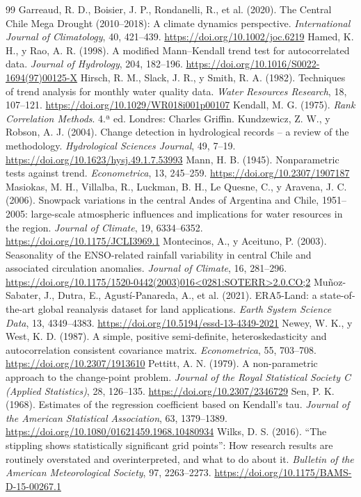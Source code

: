 \documentclass[11pt,letterpaper]{article}
\begin{document}
\begin{thebibliography}{99}
 Garreaud, R. D., Boisier, J. P., Rondanelli, R., et al. (2020). The Central Chile Mega Drought (2010--2018): A climate dynamics perspective. \emph{International Journal of Climatology}, 40, 421--439. \url{https://doi.org/10.1002/joc.6219}
 Hamed, K. H., y Rao, A. R. (1998). A modified Mann--Kendall trend test for autocorrelated data. \emph{Journal of Hydrology}, 204, 182--196. \url{https://doi.org/10.1016/S0022-1694(97)00125-X}
 Hirsch, R. M., Slack, J. R., y Smith, R. A. (1982). Techniques of trend analysis for monthly water quality data. \emph{Water Resources Research}, 18, 107--121. \url{https://doi.org/10.1029/WR018i001p00107}
 Kendall, M. G. (1975). \emph{Rank Correlation Methods}. 4.ª ed. Londres: Charles Griffin.
 Kundzewicz, Z. W., y Robson, A. J. (2004). Change detection in hydrological records -- a review of the methodology. \emph{Hydrological Sciences Journal}, 49, 7--19. \url{https://doi.org/10.1623/hysj.49.1.7.53993}
 Mann, H. B. (1945). Nonparametric tests against trend. \emph{Econometrica}, 13, 245--259. \url{https://doi.org/10.2307/1907187}
 Masiokas, M. H., Villalba, R., Luckman, B. H., Le Quesne, C., y Aravena, J. C. (2006). Snowpack variations in the central Andes of Argentina and Chile, 1951--2005: large-scale atmospheric influences and implications for water resources in the region. \emph{Journal of Climate}, 19, 6334--6352. \url{https://doi.org/10.1175/JCLI3969.1}
 Montecinos, A., y Aceituno, P. (2003). Seasonality of the ENSO-related rainfall variability in central Chile and associated circulation anomalies. \emph{Journal of Climate}, 16, 281--296. \url{https://doi.org/10.1175/1520-0442(2003)016<0281:SOTERR>2.0.CO;2}
 Muñoz-Sabater, J., Dutra, E., Agustí-Panareda, A., et al. (2021). ERA5-Land: a state-of-the-art global reanalysis dataset for land applications. \emph{Earth System Science Data}, 13, 4349--4383. \url{https://doi.org/10.5194/essd-13-4349-2021}
 Newey, W. K., y West, K. D. (1987). A simple, positive semi-definite, heteroskedasticity and autocorrelation consistent covariance matrix. \emph{Econometrica}, 55, 703--708. \url{https://doi.org/10.2307/1913610}
 Pettitt, A. N. (1979). A non-parametric approach to the change-point problem. \emph{Journal of the Royal Statistical Society C (Applied Statistics)}, 28, 126--135. \url{https://doi.org/10.2307/2346729}
 Sen, P. K. (1968). Estimates of the regression coefficient based on Kendall's tau. \emph{Journal of the American Statistical Association}, 63, 1379--1389. \url{https://doi.org/10.1080/01621459.1968.10480934}
 Wilks, D. S. (2016). ``The stippling shows statistically significant grid points'': How research results are routinely overstated and overinterpreted, and what to do about it. \emph{Bulletin of the American Meteorological Society}, 97, 2263--2273. \url{https://doi.org/10.1175/BAMS-D-15-00267.1}
\end{thebibliography}
\end{document}
